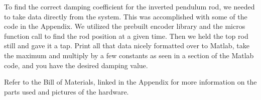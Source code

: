 \documentclass[12pt]{extarticle}
\newenvironment{sect}
  {\adjustwidth{-2.25em}{0pt}}
  {\endadjustwidth}
\begin{document}
\begin{sect}
  
  
  To find the correct damping coefficient for the inverted pendulum rod, we needed to take data directly from the system. This was accomplished with some of the code in the Appendix. We utilized the prebuilt encoder library and the micros function call to find the rod position at a given time. Then we held the top rod still and gave it a tap. Print all that data nicely formatted over to Matlab, take the maximum and multiply by a few constants as seen in a section of the Matlab code, and you have the desired damping value.
    
    
    Refer to the Bill of Materials, linked in the Appendix for more information on the parts used and pictures of the hardware.
\end{sect}

\begin{sect}

\end{sect}
\end{document}
